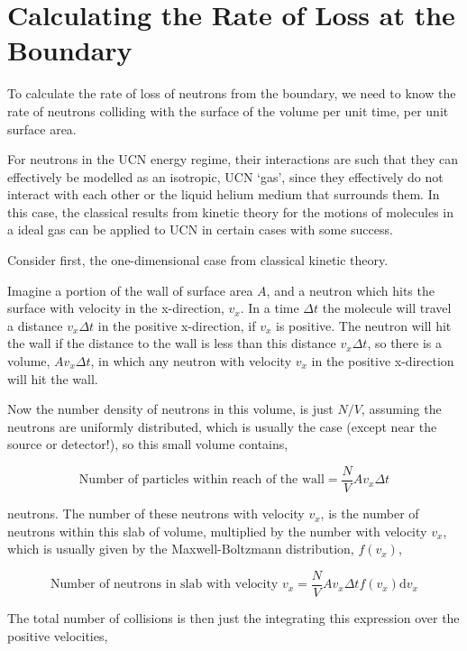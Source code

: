 \documentclass[11pt,a4paper,oneside]{article}
\begin{document}
\section*{Calculating the Rate of Loss at the Boundary}

To calculate the rate of loss of neutrons from the boundary, we need to know the rate of neutrons colliding with the surface of the volume per unit time, per unit surface area. 

For neutrons in the UCN energy regime, their interactions are such that they can effectively be modelled as an isotropic, UCN `gas', since they effectively do not interact with each other or the liquid helium medium that surrounds them. In this case, the classical results from kinetic theory for the motions of molecules in a ideal gas can be applied to UCN in certain cases with some success. 

Consider first, the one-dimensional case from classical kinetic theory. 

Imagine a portion of the wall of surface area $A$, and a neutron which hits the surface with velocity in the x-direction, $v_{x}$. In a time $\Delta t$ the molecule will travel a distance $v_{x} \Delta t$ in the positive x-direction, if $v_{x}$ is positive. The neutron will hit the wall if the distance to the wall is less than this distance $v_{x} \Delta t$, so there is a volume, $A v_{x} \Delta t$, in which any neutron with velocity $v_{x}$ in the positive x-direction will hit the wall. 

Now the number density of neutrons in this volume, is just $N/V$, assuming the neutrons are uniformly distributed, which is usually the case (except near the source or detector!), so this small volume contains, 

\begin{equation}
	\mbox{Number of particles within reach of the wall} = \frac{N}{V}Av_{x}\Delta t
\end{equation} 

neutrons. The number of these neutrons with velocity $v_{x}$, is the number of neutrons within this slab of volume, multiplied by the number with velocity $v_{x}$, which is usually given by the Maxwell-Boltzmann distribution, $f(v_{x})$,

\begin{equation}
\mbox{Number of neutrons in slab with velocity } v_{x} = \frac{N}{V}Av_{x}\Delta t f(v_{x})\mathrm{d}v_{x}
\end{equation}

The total number of collisions is then just the integrating this expression over the positive velocities, 
\end{document}
